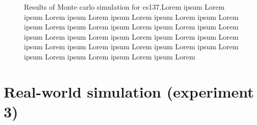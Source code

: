 \begin{figure}[!htb]
{    \label{fig:}
  }
  \newline
  \noindent 
  \caption{Results of Monte carlo simulation for cs137.Lorem ipsum  Lorem ipsum Lorem ipsum Lorem ipsum Lorem ipsum Lorem ipsum Lorem ipsum Lorem ipsum Lorem ipsum Lorem ipsum Lorem ipsum Lorem ipsum Lorem ipsum Lorem ipsum Lorem ipsum Lorem ipsum Lorem ipsum Lorem ipsum Lorem ipsum Lorem ipsum Lorem ipsum Lorem ipsum Lorem ipsum Lorem ipsum Lorem ipsum Lorem }
  \label{fig:}
\end{figure}%

\newpage
\section{Real-world simulation (experiment 3)}%




